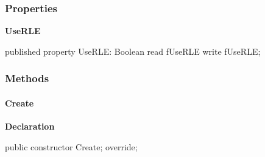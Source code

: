 \documentclass{report}
\newif\ifpdf
\begin{document}
\subsubsection*{\large{\textbf{Properties}}\normalsize\hspace{1ex}\hfill}
\begin{list}{}{
\setlength{\itemindent}{0cm}
\setlength{\listparindent}{0cm}
\setlength{\leftmargin}{\evensidemargin}
\addtolength{\leftmargin}{\tmplength}
\settowidth{\labelsep}{X}
\addtolength{\leftmargin}{\labelsep}
\setlength{\labelwidth}{\tmplength}
}
\label{opbitmapformats.TBMPImage-UseRLE}
\item[\textbf{UseRLE}\hfill]
\ifpdf
\begin{flushleft}
\fi
\begin{ttfamily}
published property UseRLE: Boolean read fUseRLE write fUseRLE;\end{ttfamily}

\ifpdf
\end{flushleft}
\fi


\par  \end{list}
\subsubsection*{\large{\textbf{Methods}}\normalsize\hspace{1ex}\hfill}
\paragraph*{Create}\hspace*{\fill}

\label{opbitmapformats.TBMPImage-Create}
\begin{list}{}{
\setlength{\itemindent}{0cm}
\setlength{\listparindent}{0cm}
\setlength{\leftmargin}{\evensidemargin}
\addtolength{\leftmargin}{\tmplength}
\settowidth{\labelsep}{X}
\addtolength{\leftmargin}{\labelsep}
\setlength{\labelwidth}{\tmplength}
}
\item[\textbf{Declaration}\hfill]
\ifpdf
\begin{flushleft}
\fi
\begin{ttfamily}
public constructor Create; override;\end{ttfamily}

\ifpdf
\end{flushleft}
\fi

\end{list}
\end{document}
